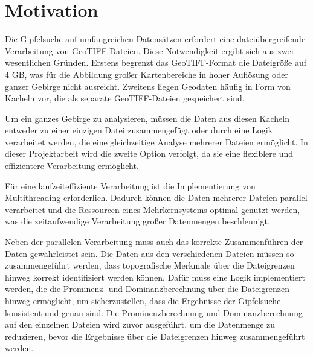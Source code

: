 \section{Motivation} \label{sec:Motivation_multi}
Die Gipfelsuche auf umfangreichen Datensätzen erfordert eine dateiübergreifende Verarbeitung von GeoTIFF-Dateien.
Diese Notwendigkeit ergibt sich aus zwei wesentlichen Gründen. Erstens begrenzt das GeoTIFF-Format die Dateigröße auf 4 GB, was für die Abbildung großer Kartenbereiche in hoher Auflösung oder ganzer Gebirge nicht ausreicht. Zweitens liegen Geodaten häufig in Form von Kacheln vor, die als separate GeoTIFF-Dateien gespeichert sind.

Um ein ganzes Gebirge zu analysieren, müssen die Daten aus diesen Kacheln entweder zu einer einzigen Datei zusammengefügt oder durch eine Logik verarbeitet werden, die eine gleichzeitige Analyse mehrerer Dateien ermöglicht. In dieser Projektarbeit wird die zweite Option verfolgt, da sie eine flexiblere und effizientere Verarbeitung ermöglicht.

Für eine laufzeiteffiziente Verarbeitung ist die Implementierung von Multithreading erforderlich. Dadurch können die Daten mehrerer Dateien parallel verarbeitet und die Ressourcen eines Mehrkernsystems optimal genutzt werden, was die zeitaufwendige Verarbeitung großer Datenmengen beschleunigt.

Neben der parallelen Verarbeitung muss auch das korrekte Zusammenführen der Daten gewährleistet sein. Die Daten aus den verschiedenen Dateien müssen so zusammengeführt werden, dass topografische Merkmale über die Dateigrenzen hinweg korrekt identifiziert werden können. Dafür muss eine Logik implementiert werden, die die Prominenz- und Dominanzberechnung über die Dateigrenzen hinweg ermöglicht, um sicherzustellen, dass die Ergebnisse der Gipfelsuche konsistent und genau sind. Die Prominenzberechnung und Dominanzberechnung auf den einzelnen Dateien wird zuvor ausgeführt, um die Datenmenge zu reduzieren, bevor die Ergebnisse über die Dateigrenzen hinweg zusammengeführt werden.